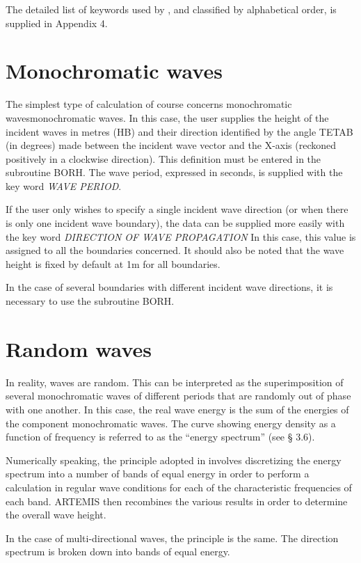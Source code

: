 The detailed list of keywords used by \artemis{}, and classified by
alphabetical order, is supplied in Appendix 4.


\section{Monochromatic waves}

The simplest type of calculation of course concerns monochromatic
wavesmonochromatic waves. In this case, the user supplies the height of
the incident waves in metres (HB) and their direction identified by the angle
TETAB (in degrees) made between the incident wave vector and the X-axis
(reckoned positively in a clockwise direction). This definition must be entered
in the subroutine BORH\@. The wave period, expressed in seconds, is
supplied with the key word \textit{WAVE PERIOD}.

If the user only wishes to specify a single incident wave direction (or when
there is only one incident wave boundary), the data can be supplied more easily
with the key word \textit{DIRECTION OF WAVE PROPAGATION} In this case, this
value is assigned to all the boundaries concerned. It should also be noted that
the wave height is fixed by default at 1m for all boundaries.

In the case of several boundaries with different incident wave directions, it
is necessary to use the subroutine BORH.


\section{Random waves}

In reality, waves are random. This can be interpreted as the superimposition of
several monochromatic waves of different periods that are randomly out of phase
with one another. In this case, the real wave energy is the sum of the energies
of the component monochromatic waves. The curve showing energy density as a
function of frequency is referred to as the ``energy spectrum'' (see {\S} 3.6).

Numerically speaking, the principle adopted in \artemis{} involves discretizing
the energy spectrum into a number of bands of equal energy in order to perform
a calculation in regular wave conditions for each of the characteristic
frequencies of each band. ARTEMIS then recombines the various results in order
to determine the overall wave height.

In the case of multi-directional waves, the principle is the same. The
direction spectrum is broken down into bands of equal energy.

